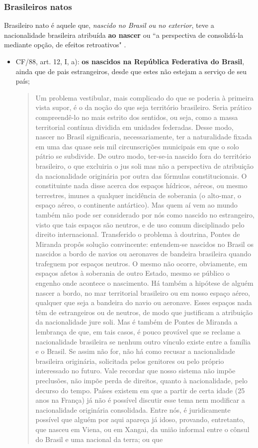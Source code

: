 \documentclass{article}
\begin{document}
\subsubsection{Brasileiros natos}

Brasileiro nato é aquele que, \textit{nascido no Brasil ou no exterior}, teve a nacionalidade brasileira atribuída \textbf{ao nascer} ou ``a perspectiva de consolidá-la mediante opção, de efeitos retroativos" \cite[p.~81]{rezek_direito_2024}.

\begin{itemize}
    \item CF/88, art. 12, I, a): \textbf{os nascidos na República Federativa do Brasil}, ainda que de pais estrangeiros, desde que estes não estejam a serviço de seu país;
    \begin{quote}
        Um problema vestibular, mais complicado do que se poderia à primeira vista supor, é o da noção do que seja território brasileiro. Seria prático compreendê-lo no mais estrito dos sentidos, ou seja, como a massa territorial contínua dividida em unidades federadas. Desse modo, nascer no Brasil significaria, necessariamente, ter a naturalidade fixada em uma das quase seis mil circunscrições municipais em que o solo pátrio se subdivide. De outro modo, ter-se-ia nascido fora do território brasileiro, o que excluiria o jus soli mas não a perspectiva de atribuição da nacionalidade originária por outra das fórmulas constitucionais. O constituinte nada disse acerca dos espaços hídricos, aéreos, ou mesmo terrestres, imunes a qualquer incidência de soberania (o alto-mar, o espaço aéreo, o continente antártico). Mas quem aí vem ao mundo também não pode ser considerado por nós como nascido no estrangeiro, visto que tais espaços são neutros, e de uso comum disciplinado pelo direito internacional. Transferido o problema à doutrina, Pontes de Miranda propôs solução convincente: entendem-se nascidos no Brasil os nascidos a bordo de navios ou aeronaves de bandeira brasileira quando trafeguem por espaços neutros. O mesmo não ocorre, obviamente, em espaços afetos à soberania de outro Estado, mesmo se público o engenho onde acontece o nascimento. Há também a hipótese de alguém nascer a bordo, no mar territorial brasileiro ou em nosso espaço aéreo, qualquer que seja a bandeira do navio ou aeronave. Esses espaços nada têm de estrangeiros ou de neutros, de modo que justificam a atribuição da nacionalidade jure soli. Mas é também de Pontes de Miranda a lembrança de que, em tais casos, é pouco provável que se reclame a nacionalidade brasileira se nenhum outro vínculo existe entre a família e o Brasil. Se assim não for, não há como recusar a nacionalidade brasileira originária, solicitada pelos genitores ou pelo próprio interessado no futuro. Vale recordar que nosso sistema não impõe preclusões, não impõe perda de direitos, quanto à nacionalidade, pelo decurso do tempo. Países existem em que a partir de certa idade (25 anos na França) já não é possível discutir esse tema nem modificar a nacionalidade originária consolidada. Entre nós, é juridicamente possível que alguém por aqui apareça já idoso, provando, entretanto, que nasceu em Viena, ou em Xangai, da união informal entre o cônsul do Brasil e uma nacional da terra; ou que 
\end{quote}
\end{itemize}
\end{document}
